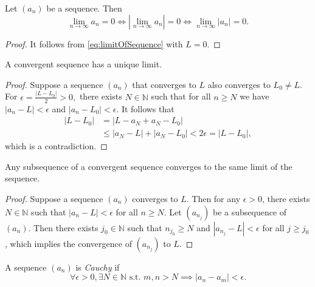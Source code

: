 \begin{lem}
  \label{lem:seqCvTo0IsEqulvalentToAbsoluteSeqCvTo0}
  Let $(a_{n})$ be a sequence. Then
  \begin{displaymath}
    \lim_{n\rightarrow \infty}a_{n}=0
    \iff
    \left|\lim_{n\rightarrow \infty}a_{n}\right|=0
    \iff
    \lim_{n\rightarrow\infty}|a_{n}|=0.
  \end{displaymath}
\end{lem}
\begin{proof}
  It follows from \eqref{eq:limitOfSequence} with $L=0$.
\end{proof}

\begin{lem}
  \label{lem:seqLimitIsUnique}
  A convergent sequence has a unique limit.
\end{lem}
\begin{proof}
  Suppose a sequence $(a_{n})$ that converges to $L$
  also converges to $L_{0}\neq L.$
  For $\epsilon=\frac{|L-L_{0}|}{2}>0,$ there exists $N\in \mathbb{N}$
  such that for all $n\ge N$ we have
  $|a_{n}-L|<\epsilon$ and $|a_{n}-L_{0}|<\epsilon$. It follows that
  \begin{align*}
    |L-L_{0}|&= |L-a_{N}+a_{N}-L_{0}|\\
    &\le |a_{N}-L|+|a_{N}-L_{0}|
    < 2\epsilon = |L-L_{0}|,
  \end{align*}
  which is a contradiction.
\end{proof}

\begin{lem}
  \label{lem:subsequenceInConvergentSequenceIsConvergent}
  Any subsequence of a convergent sequence converges
  to the same limit of the sequence.
\end{lem}
\begin{proof}
  Suppose a sequence $(a_{n})$ converges to $L$.
  Then for any $\epsilon>0$, there exists $N\in \mathbb{N}$ such that
  $|a_{n}-L|<\epsilon$ for all $n\ge N$.
  Let $(a_{n_{j}})$ be a subsequence of $(a_{n})$.
  Then there exists $j_{0}\in \mathbb{N}$
  such that $n_{j_{0}}\ge N$
  and $|a_{n_{j}}-L|<\epsilon$ for all $j\ge j_{0}$,
  which implies the convergence of $(a_{n_{j}})$ to $L$.
\end{proof}

\begin{defn}
  \label{def:CauchySequence}
  A sequence $(a_n)$ is \emph{Cauchy} if
  \begin{equation}
    \label{eq:CauchySequence}
    \forall \epsilon>0, \exists N\in \mathbb{N}
    \text{ s.t. } m,n>N \implies |a_n-a_m| < \epsilon.
  \end{equation}
\end{defn}

